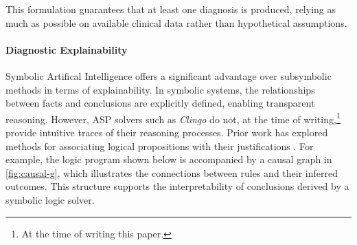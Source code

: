 \documentclass[11pt,leqno]{amsart}
\begin{document}
This formulation guarantees that at least one diagnosis is produced, 
relying as much as possible on available clinical data rather than hypothetical assumptions.
\\

\paragraph{\textbf{Diagnostic Explainability}}

Symbolic Artifical Intelligence offers a significant advantage 
over subsymbolic methods in terms of explainability. 
In symbolic systems, the relationships between facts and conclusions are explicitly defined, 
enabling transparent reasoning. However, ASP solvers such as \textit{Clingo} do not, 
at the time of writing,\footnote{At the time of writing this paper.} 
provide intuitive traces of their reasoning processes. 
Prior work has explored methods for associating logical propositions 
with their justifications \cite{cabalar2014causal}. For example, 
the logic program shown below is accompanied by a causal graph 
in \cref{fig:causal-g}, which illustrates the connections 
between rules and their inferred outcomes. 
This structure supports the interpretability of conclusions derived by a symbolic logic solver.
\end{document}
